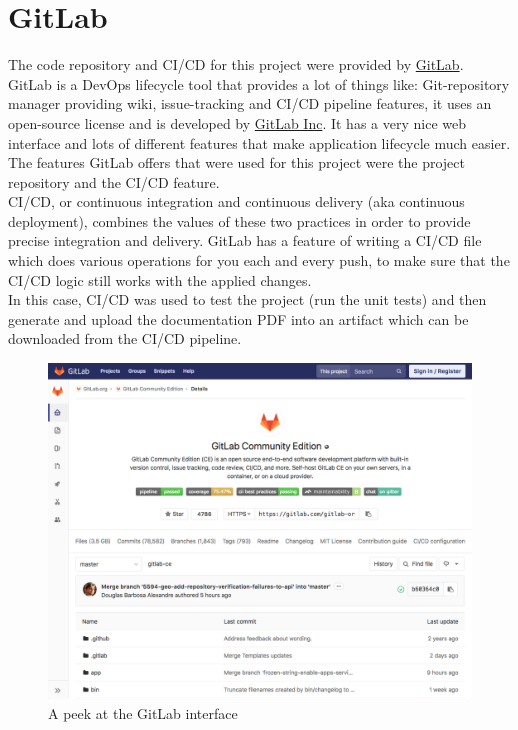 \section{GitLab}
The code repository and CI/CD for this project were provided by \href{https://gitlab.com/}{GitLab}.\\
GitLab is a DevOps lifecycle tool that provides a lot of things like: Git-repository manager providing wiki, issue-tracking and CI/CD pipeline features, it uses an open-source license and is developed by \href{https://about.gitlab.com/company/}{GitLab Inc}.
It has a very nice web interface and lots of different features that make application lifecycle much easier. The features GitLab offers that were used for this project were the project repository and the CI/CD feature.\\
\newline
CI/CD, or continuous integration and continuous delivery (aka continuous deployment), combines the values of these two practices in order to provide precise integration and delivery.
GitLab has a feature of writing a CI/CD file which does various operations for you each and every push, to make sure that the CI/CD logic still works with the applied changes.\\
In this case, CI/CD was used to test the project (run the unit tests) and then generate and upload the documentation PDF into an artifact which can be downloaded from the CI/CD pipeline.
\begin{figure}[H]
	\includegraphics[width=\linewidth]{./Images/Implementation/gitlab_view.png}
	\caption{A peek at the GitLab interface}
\end{figure}	
